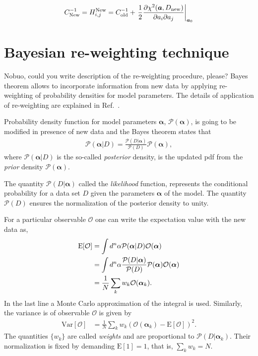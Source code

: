 \documentclass[twocolumn,showpacs,preprintnumbers,amsmath,amssymb,floatfix,prd]{revtex4}
\def\AP#1{{\color{blue} #1}}
\begin{document}
%
\begin{align}
C_{\rm New}^{-1}=
H^{\rm New}_{i,j}=
C_{\rm old}^{-1}
+
\left. \frac{1}{2}\frac{\partial\chi^2(\bm{a},D_{\rm new})}{\partial
a_i\partial a_j}
\right|_{\bm{a}_0}
\label{eq:Hnew}
\end{align}
%











\section{Bayesian re-weighting technique}
%
\AP{Nobuo, could you write description of the re-weighting procedure, please?}
Bayes theorem allows to incorporate information from new data by applying re-weighting of probability densities for model parameters. The details of application of re-weighting are explained in Ref.~\cite{Sato:2013ika}.

Probability density function for model parameters $\bm{\alpha}$, $\mathcal{P}(\bm{\alpha})$, is going to be modified in presence of new data and the Bayes theorem states that 
%
\begin{align}
\mathcal{P}(\bm{\alpha}|D)
=\frac{\mathcal{P}(D|\bm{\alpha})}{\mathcal{P}(D)} \mathcal{P}(\bm{\alpha}),
\label{eq:bayes}
\end{align}
%
where $\mathcal{P}(\bm{\alpha}|D)$ is the so-called \emph{posterior} density, 
is the updated pdf from the \emph{prior} density 
$\mathcal{P}(\bm{\alpha})$.
 
The quantity $\mathcal{P}(D|\bm{\alpha})$ called the \emph{likelihood} 
function,
represents the conditional probability for a data set $D$ given the
parameters $\bm{\alpha}$ of the model.
The quantity $\mathcal{P}(D) $ ensures the normalization of the 
posterior density to unity.  

For a particular observable $\mathcal{O}$ one can write the expectation value 
with the new data as,
%
\begin{align}
\text{E}[\mathcal{O}]
&=	\int d^n\alpha \mathcal{P}(\bm{\alpha}|D)
	\mathcal{O}(\bm{\alpha})\notag\\
&=	\int d^n\alpha \frac{\mathcal{P}(D|\bm{\alpha})}{\mathcal{P}(D)} 
	\mathcal{P}(\bm{\alpha})\mathcal{O}(\bm{\alpha})\notag\\
&=	\frac{1}{N} \sum_k w_k \mathcal{O}(\bm{\alpha}_k).
\label{eq:E}
\end{align}
%
In the last line  a Monte Carlo approximation of the integral is used.
Similarly, the variance is of observable $\mathcal{O}$ is given by
%
\begin{align}
\text{Var}[\mathcal{O}]
&=\frac{1}{N} \sum_k w_k (\mathcal{O}(\bm{\alpha}_k)-\text{E}
[\mathcal{O}])^2 .
\label{eq:Var}
\end{align}
%
The quantities $\{w_k\}$ are called \emph{weights} and are proportional to 
$\mathcal{P}(D|\bm{\alpha}_k)$. 
Their normalization is fixed by demanding $\text{E}[1]=1$, that is,  
$\sum_k w_k=N$.
\end{document}
